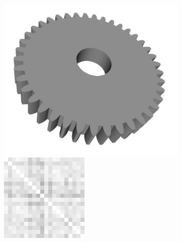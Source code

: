 \begin{figure}[ht]
	\centering
	\begin{subfigure}[b]{0.20\linewidth}
		\includegraphics[width=\linewidth]{fig/3dreg/cog.png} \\
		\includegraphics[width=\linewidth]{fig/3dreg/reg3Dtrain_cog.png} 

\end{subfigure}
\end{figure}
